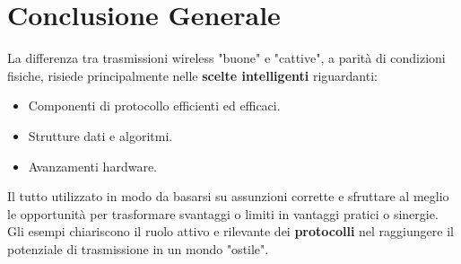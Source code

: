 \section{Conclusione Generale}
La differenza tra trasmissioni wireless "buone" e "cattive", a parità di condizioni fisiche, risiede principalmente nelle \textbf{scelte intelligenti} riguardanti:
\begin{itemize}
    \item Componenti di protocollo efficienti ed efficaci.
    \item Strutture dati e algoritmi.
    \item Avanzamenti hardware.
\end{itemize}
Il tutto utilizzato in modo da basarsi su assunzioni corrette e sfruttare al meglio le opportunità per trasformare svantaggi o limiti in vantaggi pratici o sinergie. Gli esempi chiariscono il ruolo attivo e rilevante dei \textbf{protocolli} nel raggiungere il potenziale di trasmissione in un mondo "ostile".

